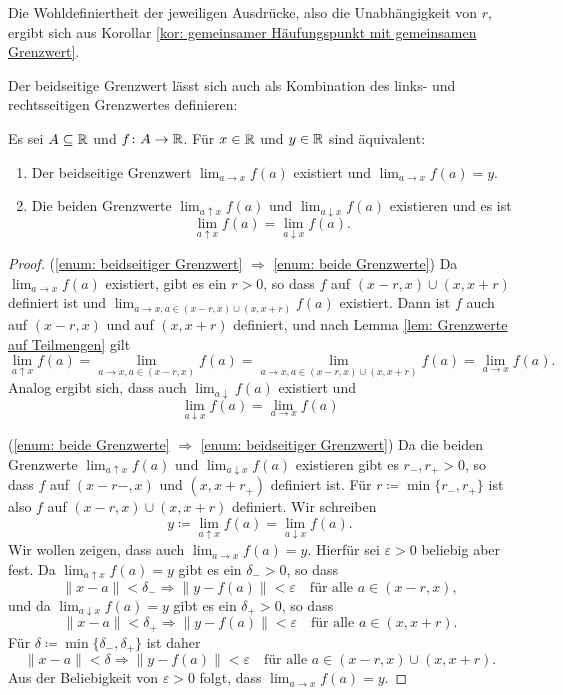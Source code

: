\documentclass[a4paper,10pt]{article}
\begin{document}
Die Wohldefiniertheit der jeweiligen Ausdrücke, also die Unabhängigkeit von $r$, ergibt sich aus Korollar \ref{kor: gemeinsamer Häufungspunkt mit gemeinsamen Grenzwert}.


Der beidseitige Grenzwert lässt sich auch als Kombination des links- und rechtsseitigen Grenzwertes definieren:


\begin{lem}
 Es sei $A \subseteq \mathbb{R}$ und $f \colon A \to \mathbb{R}$. Für $x \in \mathbb{R}$ und $y \in \mathbb{R}$ sind äquivalent:
 \begin{enumerate}
  \item\label{enum: beidseitiger Grenzwert}
   Der beidseitige Grenzwert $\lim_{a \to x} f(a)$ existiert und $\lim_{a \to x} f(a) = y$.
  \item\label{enum: beide Grenzwerte}
   Die beiden Grenzwerte $\lim_{a \uparrow x} f(a)$ und $\lim_{a \downarrow x} f(a)$ existieren und es ist
   \[
    \lim_{a \uparrow x} f(a) = \lim_{a \downarrow x} f(a).
   \]
 \end{enumerate}
\end{lem}
\begin{proof}
 (\ref{enum: beidseitiger Grenzwert} $\Rightarrow$ \ref{enum: beide Grenzwerte}) Da $\lim_{a \to x} f(a)$ existiert, gibt es ein $r > 0$, so dass $f$ auf $(x-r,x) \cup (x,x+r)$ definiert ist und $\lim_{a \to x, a \in (x-r,x) \cup (x,x+r)} f(a)$ existiert. Dann ist $f$ auch auf $(x-r,x)$ und auf $(x,x+r)$ definiert, und nach Lemma \ref{lem: Grenzwerte auf Teilmengen} gilt
 \[
  \lim_{a \uparrow x} f(a)
  = \lim_{a \to x, a \in (x-r,x)} f(a)
  = \lim_{a \to x, a \in (x-r,x) \cup (x,x+r)} f(a)
  = \lim_{a \to x} f(a).
 \]
 Analog ergibt sich, dass auch $\lim_{a \downarrow} f(a)$ existiert und
 \[
  \lim_{a \downarrow x} f(a) = \lim_{a \to x} f(a)
 \]
 
 (\ref{enum: beide Grenzwerte} $\Rightarrow$ \ref{enum: beidseitiger Grenzwert}) Da die beiden Grenzwerte $\lim_{a \uparrow x} f(a)$ und $\lim_{a \downarrow x} f(a)$ existieren gibt es $r_-, r_+ > 0$, so dass $f$ auf $(x-r-,x)$ und $(x,x+r_+)$ definiert ist. Für $r \coloneqq \min\{r_-, r_+\}$ ist also $f$ auf $(x-r,x) \cup (x,x+r)$ definiert. Wir schreiben
 \[
  y \coloneqq \lim_{a \uparrow x} f(a) = \lim_{a \downarrow x} f(a).
 \]
 Wir wollen zeigen, dass auch $\lim_{a \to x} f(a) = y$. Hierfür sei $\varepsilon > 0$ beliebig aber fest. Da $\lim_{a \uparrow x} f(a) = y$ gibt es ein $\delta_- > 0$, so dass
 \[
  \|x-a\| < \delta_- \Rightarrow \|y-f(a)\| < \varepsilon
  \quad \text{für alle $a \in (x-r,x)$},
 \]
 und da $\lim_{a \downarrow x} f(a) = y$ gibt es ein $\delta_+ > 0$, so dass
 \[
  \|x-a\| < \delta_+ \Rightarrow \|y-f(a)\| < \varepsilon
  \quad \text{für alle $a \in (x,x+r)$}.
 \]
 Für $\delta \coloneqq \min\{\delta_-, \delta_+\}$ ist daher
 \[
  \|x-a\| < \delta \Rightarrow \|y-f(a)\| < \varepsilon
  \quad \text{für alle $a \in (x-r,x) \cup (x,x+r)$}.
 \]
 Aus der Beliebigkeit von $\varepsilon > 0$ folgt, dass $\lim_{a \to x} f(a) = y$.
\end{proof}
\end{document}
